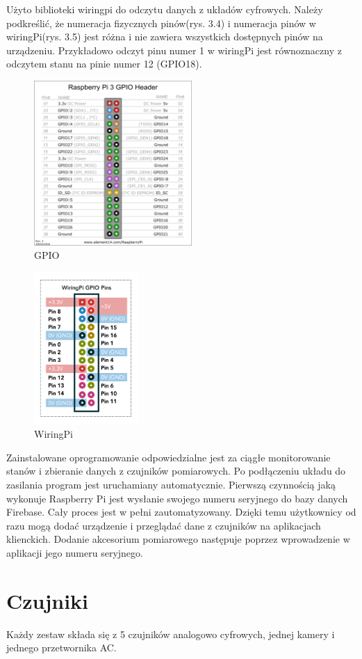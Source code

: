 Użyto biblioteki wiringpi do odczytu danych z układów cyfrowych. Należy podkreślić, że numeracja fizycznych pinów(rys. 3.4) i numeracja pinów w wiringPi(rys. 3.5) jest różna i nie zawiera wszystkich dostępnych pinów na urządzeniu. Przykładowo odczyt pinu numer 1 w wiringPi jest równoznaczny z odczytem stanu na pinie numer 12 (GPIO18).
\begin{figure}[ht]
	\centering
	\includegraphics[width=6cm]{gpio.png}
        \caption{GPIO \cite{gpio}}
\end{figure}
\begin{figure}[ht]
	\centering
	\includegraphics[width=4cm]{wiringpi.png}
        \caption{WiringPi \cite{wiringpi}}
\end{figure}
Zainstalowane oprogramowanie odpowiedzialne jest za ciągłe monitorowanie stanów i zbieranie danych z czujników pomiarowych. Po podłączeniu układu do zasilania program jest uruchamiany automatycznie. Pierwszą czynnością jaką wykonuje Raspberry Pi jest wysłanie swojego numeru seryjnego do bazy danych Firebase. Cały proces jest w pełni zautomatyzowany. Dzięki temu użytkownicy od razu mogą dodać urządzenie i przeglądać dane z czujników na aplikacjach klienckich. Dodanie akcesorium pomiarowego następuje poprzez wprowadzenie w aplikacji jego numeru seryjnego.
\section{Czujniki}
Każdy zestaw składa się z 5 czujników analogowo cyfrowych,  jednej kamery i jednego przetwornika AC. 
